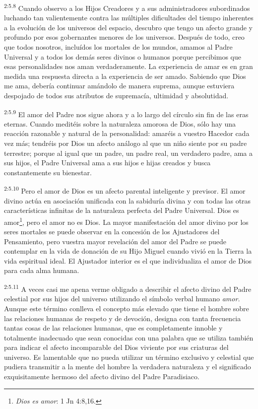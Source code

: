 \par
\textsuperscript{2:5.8} Cuando observo a los Hijos Creadores y a sus administradores subordinados luchando tan valientemente contra las múltiples dificultades del tiempo inherentes a la evolución de los universos del espacio, descubro que tengo un afecto grande y profundo por esos gobernantes menores de los universos. Después de todo, creo que todos nosotros, incluídos los mortales de los mundos, amamos al Padre Universal y a todos los demás seres divinos o humanos porque percibimos que esas personalidades nos aman verdaderamente. La experiencia de amar es en gran medida una respuesta directa a la experiencia de ser amado. Sabiendo que Dios me ama, debería continuar amándolo de manera suprema, aunque estuviera despojado de todos sus atributos de supremacía, ultimidad y absolutidad.

\par
\textsuperscript{2:5.9} El amor del Padre nos sigue ahora y a lo largo del círculo sin fin de las eras eternas. Cuando meditéis sobre la naturaleza amorosa de Dios, sólo hay una reacción razonable y natural de la personalidad: amaréis a vuestro Hacedor cada vez más; tendréis por Dios un afecto análogo al que un niño siente por su padre terrestre; porque al igual que un padre, un padre real, un verdadero padre, ama a sus hijos, el Padre Universal ama a sus hijos e hijas creados y busca constantemente su bienestar.

\par
\textsuperscript{2:5.10} Pero el amor de Dios es un afecto parental inteligente y previsor. El amor divino actúa en asociación unificada con la sabiduría divina y con todas las otras características infinitas de la naturaleza perfecta del Padre Universal. Dios es amor\footnote{\textit{Dios es amor}: 1 Jn 4:8,16.}, pero el amor no es Dios. La mayor manifestación del amor divino por los seres mortales se puede observar en la concesión de los Ajustadores del Pensamiento, pero vuestra mayor revelación del amor del Padre se puede contemplar en la vida de donación de su Hijo Miguel cuando vivió en la Tierra la vida espiritual ideal. El Ajustador interior es el que individualiza el amor de Dios para cada alma humana.

\par
\textsuperscript{2:5.11} A veces casi me apena verme obligado a describir el afecto divino del Padre celestial por sus hijos del universo utilizando el símbolo verbal humano \textit{amor.} Aunque este término conlleva el concepto más elevado que tiene el hombre sobre las relaciones humanas de respeto y de devoción, designa con tanta frecuencia tantas cosas de las relaciones humanas, que es completamente innoble y totalmente inadecuado que sean conocidas con una palabra que se utiliza también para indicar el afecto incomparable del Dios viviente por sus criaturas del universo. Es lamentable que no pueda utilizar un término exclusivo y celestial que pudiera transmitir a la mente del hombre la verdadera naturaleza y el significado exquisitamente hermoso del afecto divino del Padre Paradisiaco.

